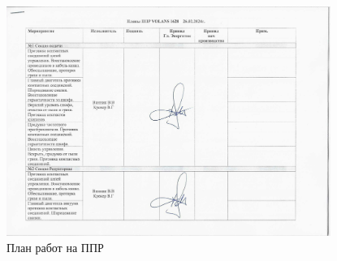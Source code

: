 \begin{figure}
\begin{center}
  \includegraphics[height=0.94\textheight, width=0.94\textwidth, keepaspectratio]{Pics 1/8 план работ на ппр_0001.jpg }
\end{center}
  \caption{План работ на ППР}
  \label{pic:8 план работ на ппр_0001}
\end{figure}

